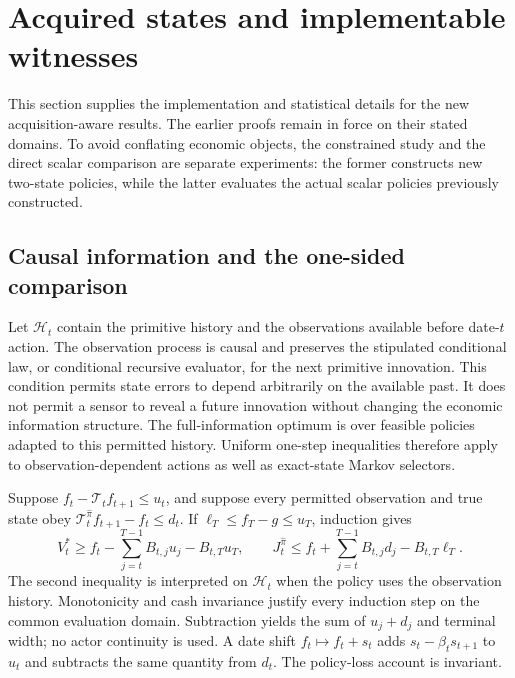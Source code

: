 \section{Acquired states and implementable witnesses}\label{supp:acquisition47}
This section supplies the implementation and statistical details for the new acquisition-aware results. The earlier proofs remain in force on their stated domains. To avoid conflating economic objects, the constrained study and the direct scalar comparison are separate experiments: the former constructs new two-state policies, while the latter evaluates the actual scalar policies previously constructed.

\subsection{Causal information and the one-sided comparison}
Let $\mathcal H_t$ contain the primitive history and the observations available before date-$t$ action. The observation process is causal and preserves the stipulated conditional law, or conditional recursive evaluator, for the next primitive innovation. This condition permits state errors to depend arbitrarily on the available past. It does not permit a sensor to reveal a future innovation without changing the economic information structure. The full-information optimum is over feasible policies adapted to this permitted history. Uniform one-step inequalities therefore apply to observation-dependent actions as well as exact-state Markov selectors.

Suppose $f_t-\mathcal T_tf_{t+1}\le u_t$, and suppose every permitted observation and true state obey $\mathcal T_t^{\widehat\pi}f_{t+1}-f_t\le d_t$. If $\ell_T\le f_T-g\le u_T$, induction gives
\[
 V_t^*\ge f_t-\sum_{j=t}^{T-1}B_{t,j}u_j-B_{t,T}u_T,
 \qquad
 J_t^{\widehat\pi}\le f_t+\sum_{j=t}^{T-1}B_{t,j}d_j-B_{t,T}\ell_T.
\]
The second inequality is interpreted on $\mathcal H_t$ when the policy uses the observation history. Monotonicity and cash invariance justify every induction step on the common evaluation domain. Subtraction yields the sum of $u_j+d_j$ and terminal width; no actor continuity is used. A date shift $f_t\mapsto f_t+s_t$ adds $s_t-\beta_ts_{t+1}$ to $u_t$ and subtracts the same quantity from $d_t$. The policy-loss account is invariant.

